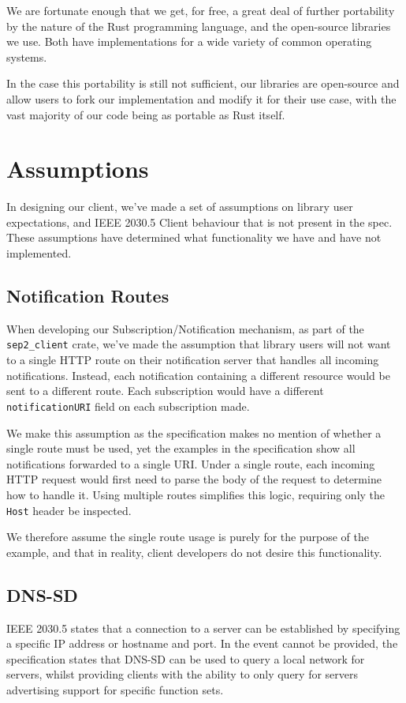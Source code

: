 We are fortunate enough that we get, for free, a great deal of further portability by the nature of the Rust programming language, and the open-source libraries we use. Both have implementations for a wide variety of common operating systems. \cite{RustPlatforms} \cite{TokioDocs}

In the case this portability is still not sufficient, our libraries are open-source and allow users to fork our implementation and modify it for their use case, with the vast majority of our code being as portable as Rust itself.
    
\section{Assumptions}
In designing our client, we've made a set of assumptions on library user expectations, and IEEE 2030.5 Client behaviour that is not present in the spec. These assumptions have determined what functionality we have and have not implemented.

\subsection{Notification Routes}
When developing our Subscription/Notification mechanism, as part of the \texttt{sep2\_client} crate, we've made the assumption that library users will not want to a single HTTP route on their notification server that handles all incoming notifications. Instead, each notification containing a different resource would be sent to a different route. Each subscription would have a different \texttt{notificationURI} field on each subscription made.

We make this assumption as the specification makes no mention of whether a single route must be used, yet the examples in the specification show all notifications forwarded to a single URI. Under a single route, each incoming HTTP request would first need to parse the body of the request to determine how to handle it. Using multiple routes simplifies this logic, requiring only the \texttt{Host} header be inspected. 

We therefore assume the single route usage is purely for the purpose of the example, and that in reality, client developers do not desire this functionality.

\subsection{DNS-SD}
IEEE 2030.5 states that a connection to a server can be established by specifying a specific IP address or hostname and port. In the event cannot be provided, the specification states that DNS-SD can be used to query a local network for servers, whilst providing clients with the ability to only query for servers advertising support for specific function sets. 

